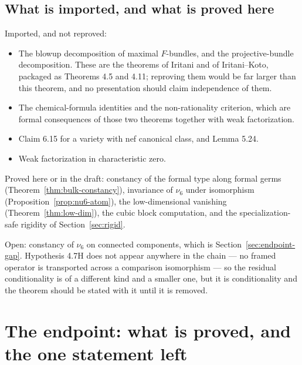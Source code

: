 \documentclass[11pt]{article}
\theoremstyle{definition}
\theoremstyle{remark}
\begin{document}
\subsection*{What is imported, and what is proved here}

Imported, and not reproved:

\begin{itemize}
\item The blowup decomposition of maximal $F$-bundles, and the projective-bundle
  decomposition. These are the theorems of Iritani and of Iritani--Koto,
  packaged as Theorems 4.5 and 4.11; reproving them would be far larger than
  this theorem, and no presentation should claim independence of them.
\item The chemical-formula identities and the non-rationality criterion, which
  are formal consequences of those two theorems together with weak
  factorization.
\item Claim 6.15 for a variety with nef canonical class, and Lemma 5.24.
\item Weak factorization in characteristic zero.
\end{itemize}

Proved here or in the draft: constancy of the formal type along formal germs
(Theorem~\ref{thm:bulk-constancy}), invariance of $\nu_6$ under isomorphism
(Proposition~\ref{prop:nu6-atom}), the low-dimensional vanishing
(Theorem~\ref{thm:low-dim}), the cubic block computation, and the
specialization-safe rigidity of Section~\ref{sec:rigid}.

Open: constancy of $\nu_6$ on connected components, which is
Section~\ref{sec:endpoint-gap}. Hypothesis 4.7H does not appear anywhere in the
chain --- no framed operator is transported across a comparison isomorphism ---
so the residual conditionality is of a different kind and a smaller one, but it
is conditionality and the theorem should be stated with it until it is removed.

\section{The endpoint: what is proved, and the one statement left}
\label{sec:unconditional}
\end{document}
